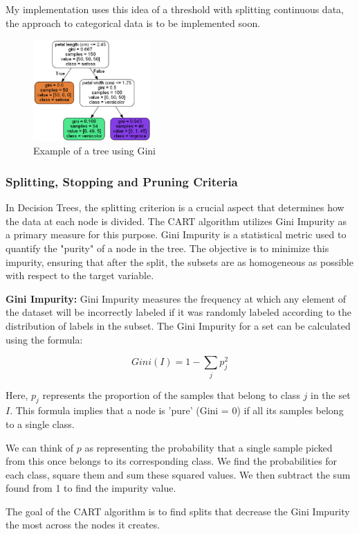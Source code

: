 \documentclass[letterpaper,10pt]{article}
\begin{document}
My implementation uses this idea of a threshold with splitting continuous data, the approach to categorical data is to be implemented soon. \par

\begin{figure}[ht]
    \centering
    \includegraphics[width=0.4\textwidth]{sklearntree.png}
    \caption{Example of a tree using Gini}
    \label{fig:sklearntree}
\end{figure}

\subsubsection{Splitting, Stopping and Pruning Criteria}
In Decision Trees, the splitting criterion is a crucial aspect that determines how the data at each node is divided. The CART algorithm utilizes Gini Impurity as a primary measure for this purpose. Gini Impurity is a statistical metric used to quantify the "purity" of a node in the tree. The objective is to minimize this impurity, ensuring that after the split, the subsets are as homogeneous as possible with respect to the target variable. \par

\textbf{Gini Impurity:}
Gini Impurity measures the frequency at which any element of the dataset will be incorrectly labeled if it was randomly labeled according to the distribution of labels in the subset. The Gini Impurity for a set can be calculated using the formula:

\[ Gini(I) = 1 - \sum_{j} p_j^2 \]

Here, \( p_j \) represents the proportion of the samples that belong to class \( j \) in the set \( I \). This formula implies that a node is 'pure' (Gini = 0) if all its samples belong to a single class. \par
We can think of \(p\) as representing the probability that a single sample picked from this once belongs to its corresponding class. We find the probabilities for each class, square them and sum these squared values. We then subtract the sum found from 1 to find the impurity value. \par
The goal of the CART algorithm is to find splits that decrease the Gini Impurity the most across the nodes it creates.
\end{document}
